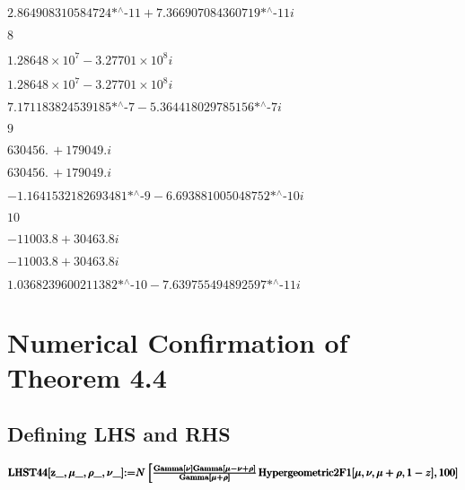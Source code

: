 \noindent\(\text{2.864908310584724$\grave{ }$*${}^{\wedge}$-11}+\text{7.366907084360719$\grave{ }$*${}^{\wedge}$-11} i\)

\noindent\(8\)

\noindent\(1.28648\times 10^7-3.27701\times 10^8 i\)

\noindent\(1.28648\times 10^7-3.27701\times 10^8 i\)

\noindent\(\text{7.171183824539185$\grave{ }$*${}^{\wedge}$-7}-\text{5.364418029785156$\grave{ }$*${}^{\wedge}$-7} i\)

\noindent\(9\)

\noindent\(630456.\, +179049. i\)

\noindent\(630456.\, +179049. i\)

\noindent\(-\text{1.1641532182693481$\grave{ }$*${}^{\wedge}$-9}-\text{6.693881005048752$\grave{ }$*${}^{\wedge}$-10} i\)

\noindent\(10\)

\noindent\(-11003.8+30463.8 i\)

\noindent\(-11003.8+30463.8 i\)

\noindent\(\text{1.0368239600211382$\grave{ }$*${}^{\wedge}$-10}-\text{7.639755494892597$\grave{ }$*${}^{\wedge}$-11} i\)

\section*{Numerical Confirmation of Theorem 4.4}

\subsection*{Defining LHS and RHS}

\begin{doublespace}
\noindent\(\pmb{\text{LHST44}[\text{z$\_$},\mu \_,\rho \_,\nu \_]\text{:=}}\\
\pmb{N\left[\frac{\text{Gamma}[\nu ]\text{Gamma}[\mu -\nu +\rho ]}{\text{Gamma}[\mu +\rho ]}\right.}\\
\pmb{\text{Hypergeometric2F1}[\mu ,\nu ,\mu +\rho ,1-z],100]}\)
\end{doublespace}

